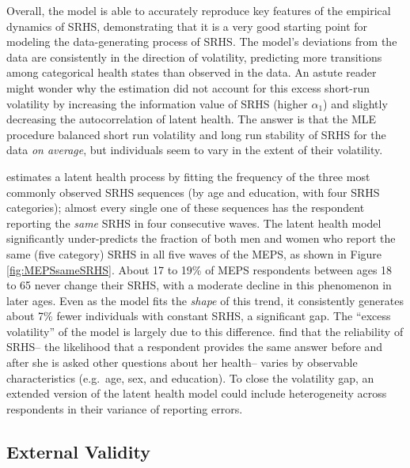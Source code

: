 \documentclass[12pt,pdftex,letterpaper]{article}
\newcommand{\LatentParam}{\alpha}
\begin{document}
Overall, the model is able to accurately reproduce key features of the empirical dynamics of SRHS, demonstrating that it is a very good starting point for modeling the data-generating process of SRHS.  The model's deviations from the data are consistently in the direction of volatility, predicting more transitions among categorical health states than observed in the data.  An astute reader might wonder why the estimation did not account for this excess short-run volatility by increasing the information value of SRHS (higher $\LatentParam_1$) and slightly decreasing the autocorrelation of latent health.  The answer is that the MLE procedure balanced short run volatility and long run stability of SRHS for the data \textit{on average}, but individuals seem to vary in the extent of their volatility.

\cite{Halliday11} estimates a latent health process by fitting the frequency of the three most commonly observed SRHS sequences (by age and education, with four SRHS categories); almost every single one of these sequences has the respondent reporting the \textit{same} SRHS in four consecutive waves.  The latent health model significantly under-predicts the fraction of both men and women who report the same (five category) SRHS in all five waves of the MEPS, as shown in Figure \ref{fig:MEPSsameSRHS}.  About 17 to 19\% of MEPS respondents between ages 18 to 65 never change their SRHS, with a moderate decline in this phenomenon in later ages.  Even as the model fits the \textit{shape} of this trend, it consistently generates about 7\% fewer individuals with constant SRHS, a significant gap.  The ``excess volatility'' of the model is largely due to this difference.  \cite{Crossley02} find that the reliability of SRHS-- the likelihood that a respondent provides the same answer before and after she is asked other questions about her health-- varies by observable characteristics (e.g.\ age, sex, and education).  To close the volatility gap, an extended version of the latent health model could include heterogeneity across respondents in their variance of reporting errors.


\subsection{External Validity}
\end{document}
